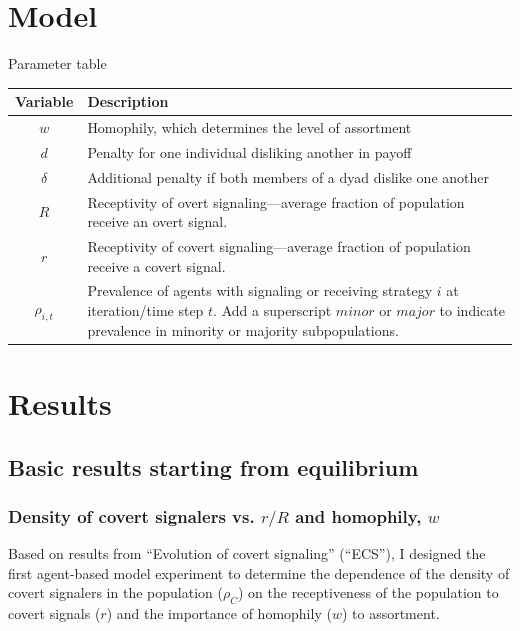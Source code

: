 \documentclass[11pt,letterpaper]{article}
\begin{document}
\section{Model}

Parameter table

\begin{table}[H]
  \centering
  \begin{tabular}{cp{6in}}
  \toprule
    Variable & Description \\
  \midrule
    $w$ & Homophily, which determines the level of assortment \\
    $d$ & Penalty for one individual disliking another in payoff \\
    $\delta$ & Additional penalty if both members of a dyad dislike one another \\
    $R$ & Receptivity of overt signaling---average fraction of population receive
      an overt signal. \\
    $r$ & Receptivity of covert signaling---average fraction of population receive
      a covert signal. \\
    $\rho_{i,t}$ & Prevalence of agents with signaling or receiving strategy $i$ at iteration/time step $t$. Add a superscript $minor$ or $major$ to indicate prevalence in 
    minority or majority subpopulations. \\
  \bottomrule
  \end{tabular}
\end{table}

\section{Results}

\subsection{Basic results starting from equilibrium}

\subsubsection{Density of covert signalers vs. $r/R$ and homophily, $w$}

Based on results from ``Evolution of covert signaling'' (``ECS''), I designed
the first agent-based model experiment to determine the dependence of the
density of covert signalers in the population ($\rho_C$) on
the receptiveness of the population to covert signals ($r$) and the
importance of homophily ($w$) to assortment. 
\end{document}
